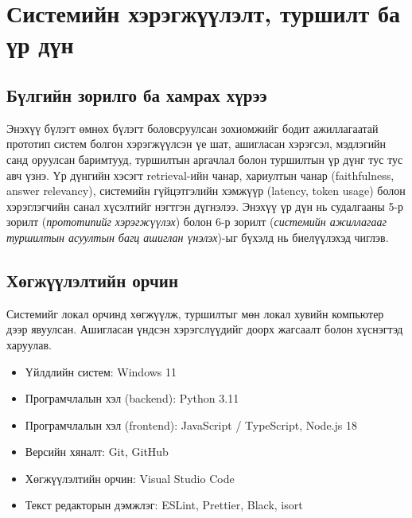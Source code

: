 
\chapter{Системийн хэрэгжүүлэлт, туршилт ба үр дүн}
\label{Chapter4}


\section{Бүлгийн зорилго ба хамрах хүрээ}

Энэхүү бүлэгт өмнөх бүлэгт боловсруулсан зохиомжийг бодит ажиллагаатай прототип систем болгон хэрэгжүүлсэн үе шат, ашигласан хэрэгсэл, мэдлэгийн санд оруулсан баримтууд, туршилтын аргачлал болон туршилтын үр дүнг тус тус авч үзнэ. Үр дүнгийн хэсэгт retrieval-ийн чанар, хариултын чанар (faithfulness, answer relevancy), системийн гүйцэтгэлийн хэмжүүр (latency, token usage) болон хэрэглэгчийн санал хүсэлтийг нэгтгэн дүгнэлээ. Энэхүү үр дүн нь судалгааны 5-р зорилт (\textit{прототипийг хэрэгжүүлэх}) болон 6-р зорилт (\textit{системийн ажиллагааг туршилтын асуултын багц ашиглан үнэлэх})-ыг бүхэлд нь биелүүлэхэд чиглэв.


\section{Хөгжүүлэлтийн орчин}

Системийг локал орчинд хөгжүүлж, туршилтыг мөн локал хувийн компьютер дээр явуулсан. Ашигласан үндсэн хэрэгслүүдийг доорх жагсаалт болон хүснэгтэд харуулав.

\begin{itemize}
    \item Үйлдлийн систем: Windows 11
    \item Програмчлалын хэл (backend): Python 3.11
    \item Програмчлалын хэл (frontend): JavaScript / TypeScript, Node.js 18
    \item Версийн хяналт: Git, GitHub
    \item Хөгжүүлэлтийн орчин: Visual Studio Code
    \item Текст редакторын дэмжлэг: ESLint, Prettier, Black, isort
\end{itemize}

